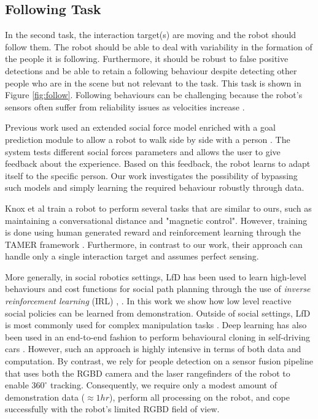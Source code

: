 \documentclass[letterpaper, 10 pt, conference]{ieeeconf}
\begin{document}
\subsection{Following Task} 

In the second task, the interaction target(s) are moving and the robot should follow them. The robot should be able to deal with variability in the formation of the people it is following. Furthermore, it should be robust to false positive detections and be able to retain a following behaviour despite detecting other people who are in the scene but not relevant to the task. This task is shown in Figure \ref{fig:follow}. Following behaviours can be challenging because the robot's sensors often suffer from reliability issues as velocities increase \cite{kobilarov2006people}.

Previous work used an extended social force model enriched with a goal prediction module to allow a robot to walk side by side with a person \cite{ferrer2016robot}. The system tests different social forces parameters and allows the user to give feedback about the experience. Based on this feedback, the robot learns to adapt itself to the specific person.  Our work investigates the possibility of bypassing such models and simply learning the required behaviour robustly through data.  

Knox et al \cite{knox2013training} train a robot to perform several tasks that are similar to ours, such as maintaining a conversational distance and "magnetic control". However, training is done using human generated reward and reinforcement learning through the TAMER framework \cite{knox2009interactively}. Furthermore, in contrast to our work, their approach can handle only a single interaction target and assumes perfect sensing.

More generally, in social robotics settings, LfD has been used to learn high-level behaviours \cite{louie2016learning,lockerd2004tutelage} and cost functions for social path planning through the use of \emph{inverse reinforcement learning} (IRL) \cite{abbeel2004apprenticeship}, \cite{henry2010learning}. In this work we show how low level reactive social policies can be learned from demonstration. Outside of social settings, LfD is most commonly used for complex manipulation tasks \cite{argall2009survey}. Deep learning has also been used in an end-to-end fashion to perform behavioural cloning in self-driving cars \cite{bojarski2016end}. However, such an approach is highly intensive in terms of both data and computation.  By contrast, we rely for people detection on a sensor fusion pipeline that uses both the RGBD camera and the laser rangefinders of the robot to enable $360^\circ$ tracking.  Consequently, we require only a modest amount of demonstration data ($\approx 1hr$), perform all processing on the robot, and cope successfully with the robot's limited RGBD field of view.
\end{document}
